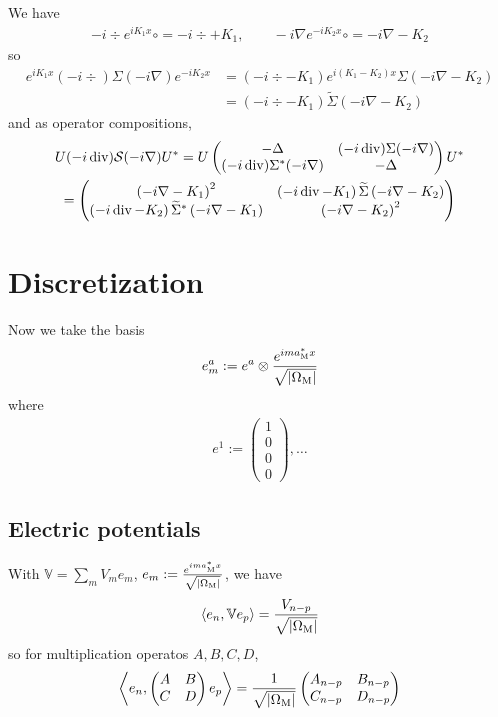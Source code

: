 \documentclass[11pt,a4paper,reqno,french,tikz]{amsart}
\newcommand{\pa}[1]{\left( #1 \right)} %
\newcommand{\ab}[1]{\left|#1\right|} %
\newcommand{\ps}[1]{\left< #1 \right>} %
\newcommand{\na}{\nabla} %
\newcommand{\f}[2]{\frac{#1}{#2}} %
\newcommand{\ind}[1]{_{\textup{#1}}} %
\newcommand{\mat}[1]{\begin{pmatrix} #1 \end{pmatrix}} %
\newcommand{\bbV}{\mathbb{V}}
\def\bbV{{\mathbb V}}
\newcommand{\sqom}{\sqrt{\ab{\Omega\ind{M}}}}
\begin{document}
We have
\begin{align*}
-i \div e^{i K_1 x} \circ = -i\div +  K_1, \qquad -i\na e^{-iK_2 x} \circ = -i\na - K_2
\end{align*}
so
\begin{align*}
e^{i K_1 x} (-i \div) \Sigma (-i\na) e^{-iK_2 x} &= \pa{-i \div -  K_1} e^{i ( K_1 - K_2) x} \Sigma \pa{-i\na - K_2} \\
&= \pa{-i \div -  K_1} \widetilde{\Sigma} \pa{-i\na - K_2}
\end{align*}
and as operator compositions,
\begin{multline*}
U(-i\div ) \cS (-i\na) U^* = U \mat{-\Delta & (-i \div) \Sigma (-i\na) \\ (-i \div) \Sigma^* (-i\na) & -\Delta} U^* \\
= \mat{ \pa{-i\na - K_1}^2 &\pa{-i \div -  K_1} \widetilde{\Sigma} \pa{-i\na - K_2} \\ \pa{-i \div - K_2} \widetilde{\Sigma}^* \pa{-i\na -  K_1} & \pa{-i\na - K_2}^2}
\end{multline*}


\section{Discretization}%
\label{sec:Discretization}


Now we take the basis
\begin{align*}
e_m^a := e^a \otimes \f{e^{i m a\ind{M}^* x}}{\sqom}
\end{align*}
 where
\begin{align*}
e^1 := \mat{1 \\ 0 \\ 0 \\ 0},\dots
\end{align*}




\subsection{Electric potentials}%
\label{sub:Electric potentials}


With $\bbV = \sum_m V_m e_m$, $e_m := \f{e^{im a\ind{M}^*x}}{\sqom}$, we have
\begin{align*}
\ps{e_n,\bbV e_p} = \f{V_{n-p}}{\sqom}
\end{align*}
so for multiplication operatos $A,B,C,D$,
\begin{align*}
	\ps{e_n, \mat{A & B \\ C & D} e_p} = \f 1\sqom \mat{ A_{n-p} & B_{n-p} \\ C_{n-p} & D_{n-p}}
\end{align*}
\end{document}
